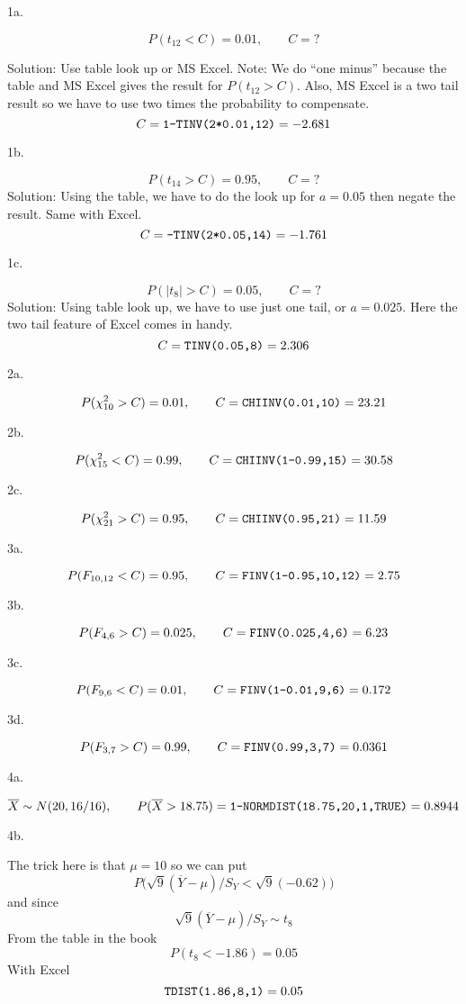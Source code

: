 \parindent=0pt

\beginsection 1a.

$$P(t_{12}<C)=0.01,\qquad C={?}$$

\bigskip
Solution: Use table look up or MS Excel.
Note: We do ``one minus'' because the table and MS Excel
gives the result for $P(t_{12}>C)$.
Also, MS Excel is a two tail result so we have to use two times the probability
to compensate.
$$C=\hbox{\tt 1-TINV(2*0.01,12)}=-2.681$$

\beginsection 1b.

$$P(t_{14}>C)=0.95,\qquad C={?}$$
\bigskip
Solution: Using the table, we have to do the look up for $a=0.05$ then negate the result.
Same with Excel.
$$C=\hbox{\tt -TINV(2*0.05,14)}=-1.761$$

\beginsection 1c.

$$P(|t_8|>C)=0.05,\qquad C={?}$$
\bigskip
Solution: Using table look up, we have to use just one tail, or $a=0.025$.
Here the two tail feature of Excel comes in handy.
$$C=\hbox{\tt TINV(0.05,8)}=2.306$$

\beginsection 2a.

$$P(\chi_{10}^2>C)=0.01,\qquad C=\hbox{\tt CHIINV(0.01,10)}=23.21$$

\beginsection 2b.

$$P(\chi_{15}^2<C)=0.99,\qquad C=\hbox{\tt CHIINV(1-0.99,15)}=30.58$$

\beginsection 2c.

$$P(\chi_{21}^2>C)=0.95,\qquad C=\hbox{\tt CHIINV(0.95,21)}=11.59$$

\beginsection 3a.

$$P(F_{10,12}<C)=0.95,\qquad C=\hbox{\tt FINV(1-0.95,10,12)}=2.75$$

\beginsection 3b.

$$P(F_{4,6}>C)=0.025,\qquad C=\hbox{\tt FINV(0.025,4,6)}=6.23$$

\beginsection 3c.

$$P(F_{9,6}<C)=0.01,\qquad C=\hbox{\tt FINV(1-0.01,9,6)}=0.172$$

\beginsection 3d.

$$P(F_{3,7}>C)=0.99,\qquad C=\hbox{\tt FINV(0.99,3,7)}=0.0361$$

\vfill
\eject

\beginsection 4a.

$$\overline X\sim N(20,16/16),\qquad
P(\overline X>18.75)=\hbox{\tt 1-NORMDIST(18.75,20,1,TRUE)}=0.8944$$

\beginsection 4b.

The trick here is that $\mu=10$ so we can put
$$P\bigg(\sqrt9(\overline Y-\mu)/S_Y<\sqrt9(-0.62)\bigg)$$
and since
$$\sqrt9(\overline Y-\mu)/S_Y\sim t_8$$
From the table in the book
$$P(t_8<-1.86)=0.05$$
With Excel
$$\hbox{\tt TDIST(1.86,8,1)}=0.05$$

